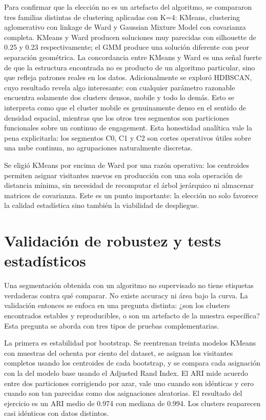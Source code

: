 \documentclass[11pt,a4paper]{article}
\begin{document}
Para confirmar que la elección no es un artefacto del algoritmo, se compararon
tres familias distintas de clustering aplicadas con K=4: KMeans, clustering
aglomerativo con linkage de Ward y Gaussian Mixture Model con covarianza
completa. KMeans y Ward producen soluciones muy parecidas con silhouette de 0.25
y 0.23 respectivamente; el GMM produce una solución diferente con peor
separación geométrica. La concordancia entre KMeans y Ward es una señal fuerte
de que la estructura encontrada no es producto de un algoritmo particular, sino
que refleja patrones reales en los datos. Adicionalmente se exploró HDBSCAN,
cuyo resultado revela algo interesante: con cualquier parámetro razonable
encuentra solamente dos clusters densos, mobile y todo lo demás. Esto se
interpreta como que el cluster mobile es genuinamente denso en el sentido de
densidad espacial, mientras que los otros tres segmentos son particiones
funcionales sobre un continuo de engagement. Esta honestidad analítica vale la
pena explicitarla: los segmentos C0, C1 y C2 son cortes operativos útiles sobre
una nube continua, no agrupaciones naturalmente discretas.

Se eligió KMeans por encima de Ward por una razón operativa: los centroides
permiten asignar visitantes nuevos en producción con una sola operación de
distancia mínima, sin necesidad de recomputar el árbol jerárquico ni almacenar
matrices de covarianza. Este es un punto importante: la elección no solo
favorece la calidad estadística sino también la viabilidad de despliegue.

\section{Validación de robustez y tests estadísticos}

Una segmentación obtenida con un algoritmo no supervisado no tiene etiquetas
verdaderas contra qué comparar. No existe accuracy ni área bajo la curva. La
validación entonces se enfoca en una pregunta distinta: ¿son los clusters
encontrados estables y reproducibles, o son un artefacto de la muestra
específica? Esta pregunta se aborda con tres tipos de pruebas complementarias.

La primera es estabilidad por bootstrap. Se reentrenan treinta modelos KMeans
con muestras del ochenta por ciento del dataset, se asignan los visitantes
completos usando los centroides de cada bootstrap, y se compara cada asignación
con la del modelo base usando el Adjusted Rand Index. El ARI mide acuerdo entre
dos particiones corrigiendo por azar, vale uno cuando son idénticas y cero
cuando son tan parecidas como dos asignaciones aleatorias. El resultado del
ejercicio es un ARI medio de 0.974 con mediana de 0.994. Los clusters reaparecen
casi idénticos con datos distintos.
\end{document}
